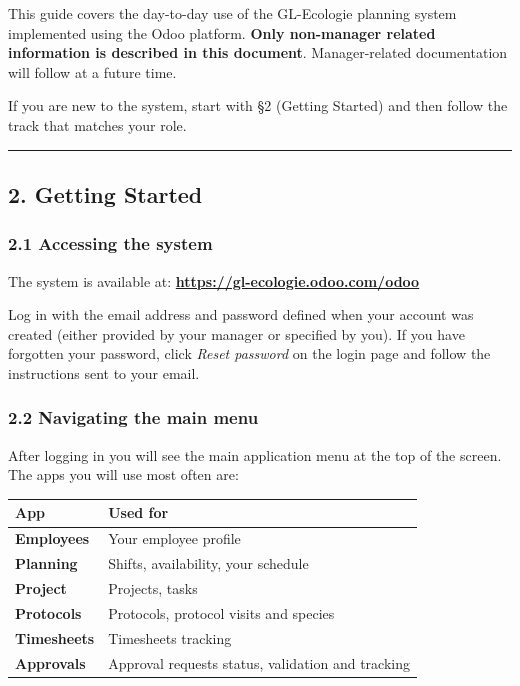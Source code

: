 \documentclass[
  paper=a4,
  ,captions=tableheading
]{scrartcl}
\begin{document}
This guide covers the day-to-day use of the GL-Ecologie planning system
implemented using the Odoo platform. \textbf{Only non-manager related
information is described in this document}. Manager-related
documentation will follow at a future time.

If you are new to the system, start with §2 (Getting Started) and then
follow the track that matches your role.

\begin{center}\rule{0.5\linewidth}{0.5pt}\end{center}

\hypertarget{getting-started}{%
\subsection{2. Getting Started}\label{getting-started}}

\hypertarget{accessing-the-system}{%
\subsubsection{2.1 Accessing the system}\label{accessing-the-system}}

The system is available at:
\href{https://gl-ecologie.odoo.com/odoo}{\textbf{https://gl-ecologie.odoo.com/odoo}}

Log in with the email address and password defined when your account was
created (either provided by your manager or specified by you). If you
have forgotten your password, click \emph{Reset password} on the login
page and follow the instructions sent to your email.

\hypertarget{navigating-the-main-menu}{%
\subsubsection{2.2 Navigating the main
menu}\label{navigating-the-main-menu}}

After logging in you will see the main application menu at the top of
the screen. The apps you will use most often are:

\begin{longtable}[]{@{}ll@{}}
\toprule\noalign{}
App & Used for \\
\midrule\noalign{}
\endhead
\bottomrule\noalign{}
\endlastfoot
\textbf{Employees} & Your employee profile \\
\textbf{Planning} & Shifts, availability, your schedule \\
\textbf{Project} & Projects, tasks \\
\textbf{Protocols} & Protocols, protocol visits and species \\
\textbf{Timesheets} & Timesheets tracking \\
\textbf{Approvals} & Approval requests status, validation and
tracking \\
\end{longtable}
\end{document}
